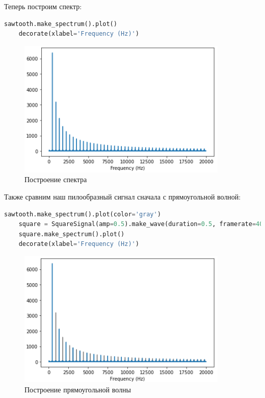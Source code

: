 \documentclass[a4paper]{article}
\begin{document}
            Теперь построим спектр:
            
\begin{lstlisting}[language=Python, caption= Построение спектра]
    sawtooth.make_spectrum().plot()
    decorate(xlabel='Frequency (Hz)')
\end{lstlisting}               
            
            \begin{figure}[H]
                \centering
                \includegraphics[width=\textwidth]{ex_2_class_spectr_1.png}
                \caption{Построение спектра}
                \label{fig:class_spectr_1}
            \end{figure}
            
            Также сравним наш пилообразный сигнал сначала с прямоугольной волной:
            
\begin{lstlisting}[language=Python, caption= Построение прямоугольной волны]
    sawtooth.make_spectrum().plot(color='gray')
    square = SquareSignal(amp=0.5).make_wave(duration=0.5, framerate=40000)
    square.make_spectrum().plot()
    decorate(xlabel='Frequency (Hz)')
\end{lstlisting}               
            
            \begin{figure}[H]
                \centering
                \includegraphics[width=\textwidth]{ex_2_compare_square.png}
                \caption{Построение прямоугольной волны}
                \label{fig:compare_square}
            \end{figure}
            
\end{document}
